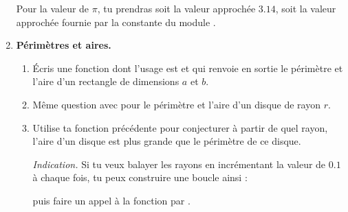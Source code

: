 \documentclass[11pt,class=report,crop=false]{standalone}
\begin{document}
\begin{activite}
\begin{enumerate}
   Pour la valeur de $\pi$, tu prendras soit la valeur approchée $3.14$, soit la valeur approchée fournie par la constante  du module .
  
  
  \item \textbf{Périmètres et aires.}
  
  \begin{enumerate}
    \item Écris une fonction dont l'usage est  et qui renvoie en sortie le périmètre et l'aire d'un rectangle de dimensions $a$ et $b$.
   
    
    \item Même question avec  pour le périmètre et l'aire d'un disque de rayon $r$.
    
    \item Utilise ta fonction précédente pour conjecturer à partir de quel rayon, l'aire d'un disque est plus grande que le périmètre de ce disque.
    
    \emph{Indication.} Si tu veux balayer les rayons en incrémentant la valeur de $0.1$ à chaque fois, tu peux construire une boucle ainsi :\\
    \centerline{}
    puis faire un appel à la fonction par .
  \end{enumerate}
\end{enumerate}
  

\end{activite}




\end{document}
